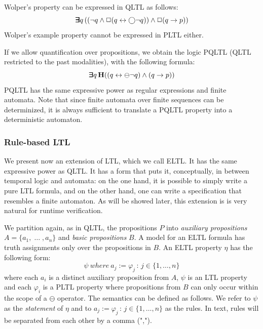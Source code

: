\noindent
Wolper's property can be expressed in QLTL as follows:
\begin{equation} \label{form0} \bm{\exists}\kern-0.6em\bm{\exists} q \,
( (  \neg q \wedge \Box (q \leftrightarrow \bigcirc \neg q )  )  \wedge \Box (q \rightarrow p ) )\end{equation}
Wolper's example property cannot be expressed in PLTL either.

If we allow
quantification over propositions, we obtain the logic PQLTL
(QLTL restricted to the past modalities), with the following formula:
\begin{equation} \label{form1} \bm{\exists}\kern-0.6em\bm{\exists} q \,
{\bf H} (( q \leftrightarrow \ominus \neg q )   \wedge (q \rightarrow p ) )\end{equation}
PQLTL has the same expressive
power as regular expressions and finite automata.
Note that since finite automata over finite sequences can be determinized, it is always sufficient to translate a
PQLTL property into a deterministic
automaton.


\subsubsection{Rule-based LTL}

We present now an extension of LTL, which we call ELTL. It has the same
expressive power as  QLTL.
It has a form that puts it, conceptually, in between temporal
logic and automata: on the one hand, it is possible to simply write
a pure LTL formula, and on the other hand, one can write a specification that resembles a finite automaton. As will be showed later, this extension is
is very natural for runtime verification.

We partition again, as in QLTL, the propositions $P$ into
{\em auxiliary propositions} $A = \{ a_1 , \; \ldots\; , a_n \}$
and {\em basic propositions} $B$. A model for an ELTL formula has truth assignments only over the propositions in $B$.
An ELTL property $\eta$ has the following form: 
\begin{equation} \label{ELTL}
\psi \mathit{\ where\ } a_j  := \varphi_j \, : \, 
 {j \in \{1, \ldots , n\}} \end{equation}
where each $a_i$ is a distinct auxiliary proposition from $A$,
$\psi$ is an LTL property and each $\varphi_i$ 
is a PLTL property where propositions from $B$ can
only occur within the scope of a $\ominus$ operator.
The semantics can be defined as follows. We refer to $\psi$
as the {\em statement} of $\eta$ and to 
$a_j  := \varphi_j \, : \, 
 {j \in \{1, \ldots , n\}}$ as the rules. In text, rules
 will be separated from each other by a comma (",").


